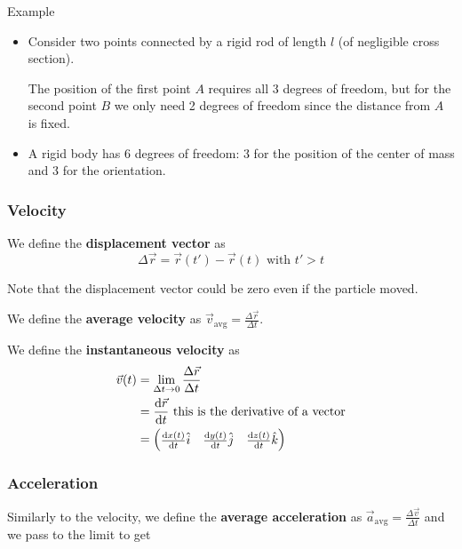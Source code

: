 \documentclass[10pt]{extarticle}
\begin{document}
\begin{examplebox}{Example}
    \begin{itemize}
        \item Consider two points connected by a rigid rod of length $l$ (of negligible cross section).

              The position of the first point $A$ requires all 3 degrees of freedom,
              but for the second point $B$ we only need 2 degrees of freedom since the distance from $A$ is fixed.

        \item A rigid body has 6 degrees of freedom: 3 for the position of the center of mass and 3 for the orientation.
    \end{itemize}

\end{examplebox}

\subsubsection{Velocity}

We define the \textbf{displacement vector} as
$$
    \Delta \vec{r} = \vec{r}(t') - \vec{r}(t) \text{ with } t' > t
$$

Note that the displacement vector could be zero even if the particle moved.

We define the \textbf{average velocity} as $\vec{v}_{\text{avg}} = \frac{\Delta \vec{r}}{\Delta t}$.

We define the \textbf{instantaneous velocity} as
\begin{align*}
    \vec{v}(t) & = \lim_{\Delta t \to 0} \frac{\Delta \vec{r}}{\Delta t}                                            \\
               & = \dv{\vec{r}}{t} \text{ this is the derivative of a vector}                                       \\
               & = \begin{pmatrix} \dv{x(t)}{t} \hat{i} & \dv{y(t)}{t} \hat{j} & \dv{z(t)}{t} \hat{k} \end{pmatrix}
\end{align*}

\subsubsection{Acceleration}

Similarly to the velocity, we define the \textbf{average acceleration} as $\vec{a}_{\text{avg}} = \frac{\Delta \vec{v}}{\Delta t}$
and we pass to the limit to get
\end{document}
